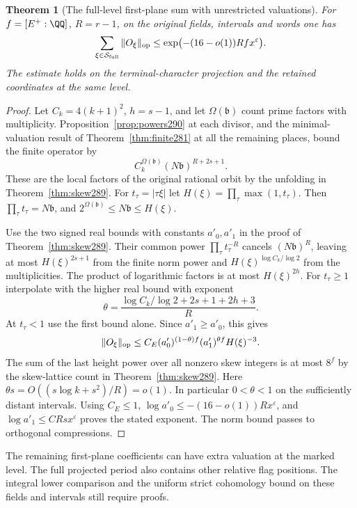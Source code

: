 \documentclass[a4paper,11pt]{article}
\newtheorem{theorem}[proposition]{Theorem}
\theoremstyle{definition}
\theoremstyle{remark}
\numberwithin{equation}{section}
\begin{document}
\begin{theorem}[The full-level first-plane sum with unrestricted valuations]\leavevmode
\label{thm:good290}
For \(f=[E^+:\QQ]\), \(R=r-1\), on the original fields,
intervals and words one has
\[
   \sum_{\xi\in\mathcal S_{\rm full}}\|O_\xi\|_{\rm op}
       \le \exp\bigl(-(16-o(1))Rf x^\varepsilon\bigr).
\]
The estimate holds on the terminal-character projection
and the retained coordinates at the same level.
\end{theorem}
\begin{proof}
Let \(C_k=4(k+1)^2\), \(h=s-1\),
and let \(\Omega(\mathfrak b)\) count prime factors
with multiplicity. Proposition~\ref{prop:powers290}
at each divisor, and the minimal-valuation result
of Theorem~\ref{thm:finite281} at all the remaining
places, bound the finite operator by
\[
       C_k^{\Omega(\mathfrak b)}
                     (N\mathfrak b)^{R+2s+1}.
\]
These are the local factors of the original rational
orbit by the unfolding in Theorem~\ref{thm:skew289}.
For \(t_\tau=|\tau\xi|\) let
\(H(\xi)=\prod_\tau\max(1,t_\tau)\). Then
\(\prod_\tau t_\tau=N\mathfrak b\), and
\(2^{\Omega(\mathfrak b)}\le N\mathfrak b\le H(\xi)\).

Use the two signed real bounds with constants \(a'_0,a'_1\)
in the proof of Theorem~\ref{thm:skew289}. Their common
power \(\prod_\tau t_\tau^{-R}\) cancels
\((N\mathfrak b)^R\), leaving at most \(H(\xi)^{2s+1}\)
from the finite norm power and \(H(\xi)^{\log C_k/\log2}\)
from the multiplicities. The product of logarithmic factors
is at most \(H(\xi)^{2h}\). For \(t_\tau\ge1\) interpolate
with the higher real bound with exponent
\[
         \theta=\frac{\log C_k/\log2+2s+1+2h+3}{R}.
\]
At \(t_\tau<1\) use the first bound alone. Since
\(a'_1\ge a'_0\), this gives
\[
 \|O_\xi\|_{\rm op}
 \le C_E(a'_0)^{(1-\theta)f}(a'_1)^{\theta f}H(\xi)^{-3}.
\]
The sum of the last height power over all nonzero skew
integers is at most \(8^f\) by the skew-lattice count in
Theorem~\ref{thm:skew289}. Here
\(\theta s=O((s\log k+s^2)/R)=o(1)\). In particular
\(0<\theta<1\) on the sufficiently distant intervals.
Using \(C_E\le1\),
\(\log a'_0\le-(16-o(1))R x^\varepsilon\), and
\(\log a'_1\le C R s x^\varepsilon\) proves the stated
exponent. The norm bound passes to orthogonal compressions.
\end{proof}

The remaining first-plane coefficients can have extra
valuation at the marked level. The full projected period
also contains other relative flag positions. The integral
lower comparison and the uniform strict cohomology bound
on these fields and intervals still require proofs.
\end{document}
